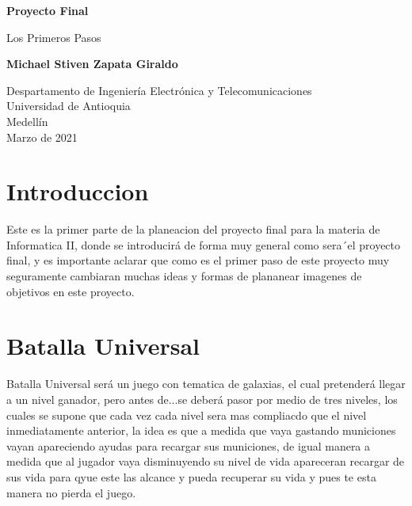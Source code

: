 \documentclass{article}
\begin{document}
\begin{titlepage}
    \begin{center}
        \vspace*{1cm}
            
        \Huge
        \textbf{Proyecto Final}
            
        \vspace{0.5cm}
        \LARGE
         Los Primeros Pasos
            
        \vspace{1.5cm}
            
        \textbf{Michael Stiven Zapata Giraldo}
            
        \vfill
            
        \vspace{0.8cm}
            
        \Large
        Despartamento de Ingeniería Electrónica y Telecomunicaciones\\
        Universidad de Antioquia\\
        Medellín\\
        Marzo de 2021
            
    \end{center}
\end{titlepage}

\tableofcontents
\newpage
\section{Introduccion}\label{intro}

Este es la primer parte de la planeacion del proyecto final para la materia de Informatica II, donde se introducirá de forma muy general como sera´el proyecto final, y es importante aclarar que como es el primer paso de este proyecto muy seguramente cambiaran muchas ideas y formas de plananear imagenes de objetivos en este proyecto.  

\section{Batalla Universal} \label{contenido}
Batalla Universal será un juego con tematica de galaxias, el cual pretenderá llegar a un nivel ganador, pero antes de...se deberá pasor por medio de tres niveles, los cuales se supone que cada vez cada nivel sera mas compliacdo que el nivel inmediatamente anterior, la idea es que a medida que vaya gastando municiones vayan apareciendo ayudas para recargar sus municiones, de igual manera a medida que al jugador vaya disminuyendo su nivel de vida apareceran recargar de sus vida para qyue este las alcance y pueda recuperar su vida y pues  te esta manera no pierda el juego. 
\end{document}
